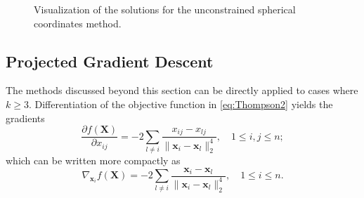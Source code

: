 \documentclass[11pt]{article}
\begin{document}
\begin{figure}[!htb]
  \centering
  \caption{Visualization of the solutions for the unconstrained spherical coordinates method.}
  \label{fig:SphereResults}
\end{figure}

\subsection{Projected Gradient Descent}
The methods discussed beyond this section can be directly applied to cases where $k\ge3$. 
Differentiation of the objective function in \eqref{eq:Thompson2} yields the gradients
\begin{equation}
\frac{\partial f(\bm{X})}{\partial x_{ij}} = -2\sum_{l\neq i}\frac{x_{ij}-x_{lj}}{\|\bm{x}_i-\bm{x}_l\|_2^4}, \quad 1\le i,j\le n;
\end{equation}
which can be written more compactly as
\begin{equation}\label{eq:gradient}
\nabla_{\bm{x}_i} f(\bm{X}) = -2\sum_{l\neq i} \frac{\bm{x}_i-\bm{x}_l}{\|\bm{x}_i-\bm{x}_l\|_2^4}, \quad 1\le i\le n.
\end{equation}
\end{document}
